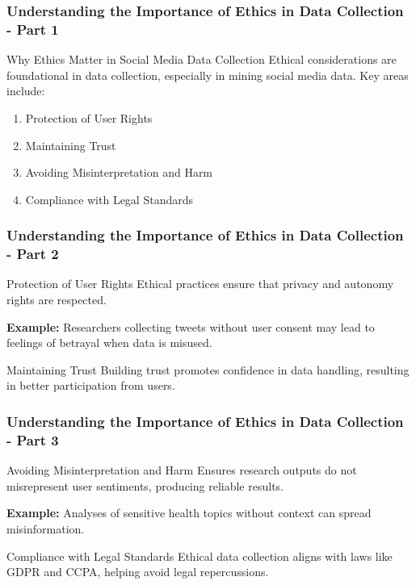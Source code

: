 \documentclass{beamer}
\begin{document}
\begin{frame}[fragile]
    \frametitle{Understanding the Importance of Ethics in Data Collection - Part 1}
    \begin{block}{Why Ethics Matter in Social Media Data Collection}
        Ethical considerations are foundational in data collection, especially in mining social media data. Key areas include:
    \end{block}
    
    \begin{enumerate}
        \item Protection of User Rights
        \item Maintaining Trust
        \item Avoiding Misinterpretation and Harm
        \item Compliance with Legal Standards
    \end{enumerate}
\end{frame}

\begin{frame}[fragile]
    \frametitle{Understanding the Importance of Ethics in Data Collection - Part 2}
    
    \begin{block}{Protection of User Rights}
        Ethical practices ensure that privacy and autonomy rights are respected.
        
        \textbf{Example:} Researchers collecting tweets without user consent may lead to feelings of betrayal when data is misused.
    \end{block}
    
    \begin{block}{Maintaining Trust}
        Building trust promotes confidence in data handling, resulting in better participation from users.
    \end{block}
\end{frame}

\begin{frame}[fragile]
    \frametitle{Understanding the Importance of Ethics in Data Collection - Part 3}
    
    \begin{block}{Avoiding Misinterpretation and Harm}
        Ensures research outputs do not misrepresent user sentiments, producing reliable results.
        
        \textbf{Example:} Analyses of sensitive health topics without context can spread misinformation.
    \end{block}
    
    \begin{block}{Compliance with Legal Standards}
        Ethical data collection aligns with laws like GDPR and CCPA, helping avoid legal repercussions.
    \end{block}
\end{frame}
\end{document}
